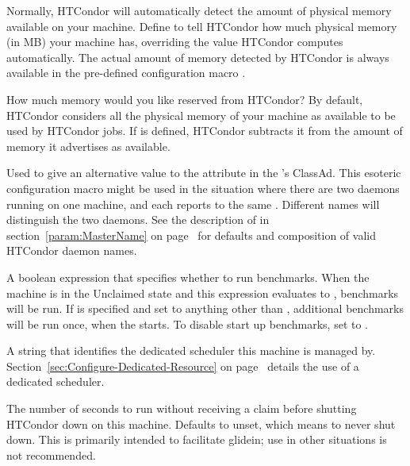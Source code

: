 \begin{description}
\label{param:Memory}
\item[\Macro{MEMORY}]
  Normally, HTCondor will automatically detect the amount of physical
  memory available on your machine.  Define  to tell
  HTCondor how much physical memory (in MB) your machine has, overriding
  the value HTCondor computes automatically.  The actual amount of memory
  detected by HTCondor is always available in the pre-defined configuration
  macro .

\label{param:ReservedMemory}
\item[\Macro{RESERVED\_MEMORY}]
  How much memory would you like reserved from HTCondor?  By default,
  HTCondor considers all the physical memory of your machine as
  available to be used by HTCondor jobs.  If  is
  defined, HTCondor subtracts it from the amount of memory it advertises
  as available.

\label{param:StartdName}
\item[\Macro{STARTD\_NAME}]
  Used to give an alternative value to the  attribute
  in the 's ClassAd.
  This esoteric configuration macro might be used in the situation
  where there are two  daemons running on one machine,
  and each reports to the same .
  Different names will distinguish the two daemons.
  See the description of  in
  section~\ref{param:MasterName} on page~\pageref{param:MasterName}
  for defaults and composition of valid HTCondor daemon names.

\label{param:RunBenchmarks}
\item[\Macro{RUNBENCHMARKS}]
  A boolean expression that specifies whether to run benchmarks.
  When the machine is in the Unclaimed state and this expression
  evaluates to , benchmarks will be run.
  If  is specified and set to anything other 
  than ,
  additional benchmarks will be run once,
  when the  starts.
  To disable start up benchmarks, set  to .

\label{param:DedicatedScheduler}
\item[\Macro{DedicatedScheduler}]
  A string that identifies the dedicated scheduler this machine is managed by.
  Section~\ref{sec:Configure-Dedicated-Resource}
  on page~\pageref{sec:Configure-Dedicated-Resource} details the use of
  a dedicated scheduler.

\label{param:StartdNoclaimShutdown}
\item[\Macro{STARTD\_NOCLAIM\_SHUTDOWN}]
  The number of seconds to run without receiving a claim before
  shutting HTCondor down on this machine.  Defaults to unset, which
  means to never shut down.  
  This is primarily intended to facilitate glidein;
  use in other situations is not recommended.


\end{description}

